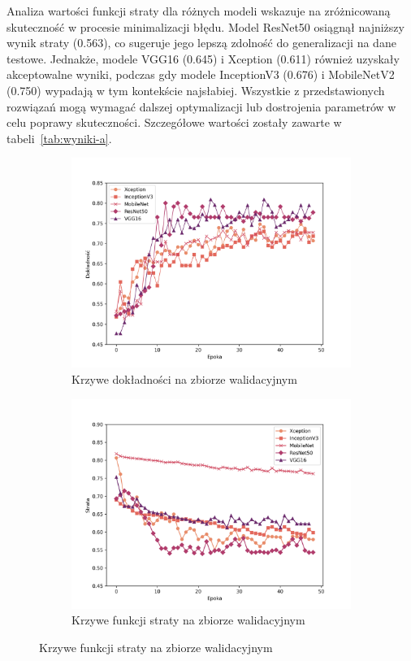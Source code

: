 Analiza wartości funkcji straty dla różnych modeli wskazuje na zróżnicowaną skuteczność w procesie minimalizacji błędu.
Model ResNet50 osiągnął najniższy wynik straty (0.563), co sugeruje jego lepszą zdolność do generalizacji na dane testowe.
Jednakże, modele VGG16 (0.645) i Xception (0.611) również uzyskały akceptowalne wyniki, podczas gdy modele InceptionV3 (0.676) i MobileNetV2 (0.750) wypadają w tym kontekście najsłabiej.
Wszystkie z przedstawionych rozwiązań mogą wymagać dalszej optymalizacji lub dostrojenia parametrów w celu poprawy skuteczności.
Szczegółowe wartości zostały zawarte w tabeli~\ref{tab:wyniki-a}.

\begin{figure}[ht]
    \centering
    \begin{subfigure}{0.49\textwidth}
        \centering
        \includegraphics[width=\textwidth]{./img/results/a_acc}
        \caption{Krzywe dokładności na zbiorze walidacyjnym\@}
        \label{fig:a_acc}
    \end{subfigure}
    \begin{subfigure}{0.49\textwidth}
        \centering
        \includegraphics[width=\textwidth]{./img/results/a_loss}
        \caption{Krzywe funkcji straty na zbiorze walidacyjnym\@}
        \label{fig:a_loss}
    \end{subfigure}


\end{figure}
